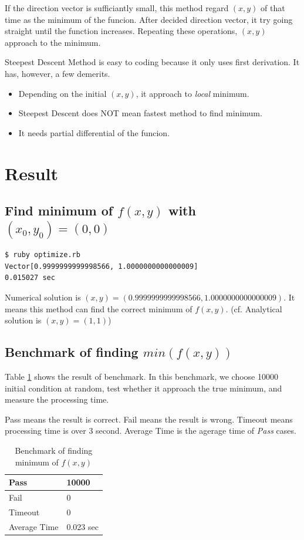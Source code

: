 \documentclass[a4paper,titlepage]{article}
\begin{document}
  If the direction vector is sufficiantly small, this method regard $(x,y)$ of that time as the minimum of the funcion.
  After decided direction vector, it try going straight until the function increases.
  Repeating these operations, $(x,y)$ approach to the minimum.

  Steepest Descent Method is easy to coding because it only uses first derivation. It has, however, a few demerits.
  \begin{itemize}
    \item Depending on the initial $(x,y)$, it approach to \emph{local} minimum.
    \item Steepest Descent does NOT mean fastest method to find minimum.
    \item It needs partial differential of the funcion.
  \end{itemize}

  \section{Result}
  \subsection{Find minimum of $f(x,y)$ with $(x_0, y_0)=(0,0)$}
  \begin{verbatim}
$ ruby optimize.rb
Vector[0.9999999999998566, 1.0000000000000009]
0.015027 sec\end{verbatim}

  Numerical solution is $(x,y) = (0.9999999999998566, 1.0000000000000009)$. It means this method can find the correct minimum of $f(x,y)$.
  (cf. Analytical solution is $(x,y)=(1,1)$)

  \subsection{Benchmark of finding $min(f(x,y))$}

  Table \ref{tb:benchmark-f} shows the result of benchmark.
  In this benchmark, we choose 10000 initial condition at random, test whether it approach the true minimum, and measure the processing time.

  Pass means the result is correct. Fail means the result is wrong. Timeout means processing time is over 3 second.
  Average Time is the agerage time of \emph{Pass} cases.

  \begin{table}[htbp]
    \centering
    \begin{tabular}{ll}\\\hline
      Pass & 10000 \\\hline
      Fail & 0 \\\hline
      Timeout & 0 \\\hline
      Average Time & 0.023 sec \\\hline
    \end{tabular}
    \caption {Benchmark of finding minimum of $f(x,y)$}
    \label{tb:benchmark-f}
  \end{table}
\end{document}
